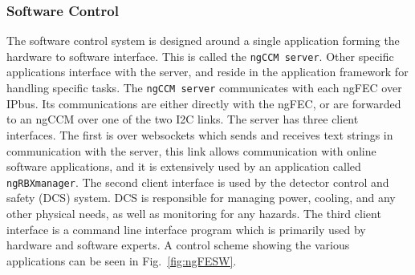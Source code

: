 \subsubsection{Software Control}
\label{sec:HCALphaseI_control}
The software control system is designed around a single application forming the hardware to software interface.  This is called the \texttt{ngCCM server}. Other specific applications interface with the server, and reside in the \HCAL application framework for handling specific tasks.
The \texttt{ngCCM server} communicates with each ngFEC over IPbus.  Its communications are either directly with the ngFEC, or are forwarded to an ngCCM over one of the two I2C links.  The server has three client interfaces. The first is over websockets which sends and receives text strings in communication with the server, this link allows communication with \HCAL online software applications, and it is extensively used by an application called \texttt{ngRBXmanager}.  The second client interface is used by the detector control and safety (DCS) system.  DCS is responsible for managing power, cooling, and any other physical needs, as well as monitoring for any hazards.  The third client interface is a command line interface program which is primarily used by hardware and software experts.  A control scheme showing the various applications can be seen in Fig.~\ref{fig:ngFESW}.


